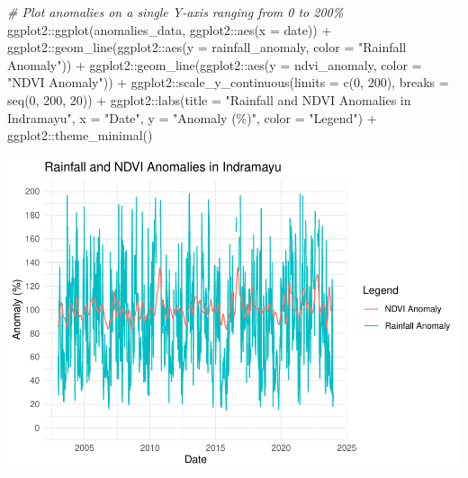 \documentclass[
]{article}
\newenvironment{Shaded}{}{}
\newcommand{\AttributeTok}[1]{\textcolor[rgb]{0.49,0.56,0.16}{#1}}
\newcommand{\CommentTok}[1]{\textcolor[rgb]{0.38,0.63,0.69}{\textit{#1}}}
\newcommand{\DecValTok}[1]{\textcolor[rgb]{0.25,0.63,0.44}{#1}}
\newcommand{\FunctionTok}[1]{\textcolor[rgb]{0.02,0.16,0.49}{#1}}
\newcommand{\NormalTok}[1]{#1}
\newcommand{\SpecialCharTok}[1]{\textcolor[rgb]{0.25,0.44,0.63}{#1}}
\newcommand{\StringTok}[1]{\textcolor[rgb]{0.25,0.44,0.63}{#1}}
\begin{document}
\begin{Shaded}
\begin{Highlighting}[]
\CommentTok{\# Plot anomalies on a single Y{-}axis ranging from 0 to 200\%}
\NormalTok{ggplot2}\SpecialCharTok{::}\FunctionTok{ggplot}\NormalTok{(anomalies\_data, ggplot2}\SpecialCharTok{::}\FunctionTok{aes}\NormalTok{(}\AttributeTok{x =}\NormalTok{ date)) }\SpecialCharTok{+}
\NormalTok{  ggplot2}\SpecialCharTok{::}\FunctionTok{geom\_line}\NormalTok{(ggplot2}\SpecialCharTok{::}\FunctionTok{aes}\NormalTok{(}\AttributeTok{y =}\NormalTok{ rainfall\_anomaly, }
                                  \AttributeTok{color =} \StringTok{"Rainfall Anomaly"}\NormalTok{)) }\SpecialCharTok{+}
\NormalTok{  ggplot2}\SpecialCharTok{::}\FunctionTok{geom\_line}\NormalTok{(ggplot2}\SpecialCharTok{::}\FunctionTok{aes}\NormalTok{(}\AttributeTok{y =}\NormalTok{ ndvi\_anomaly, }
                                  \AttributeTok{color =} \StringTok{"NDVI Anomaly"}\NormalTok{)) }\SpecialCharTok{+}
\NormalTok{  ggplot2}\SpecialCharTok{::}\FunctionTok{scale\_y\_continuous}\NormalTok{(}\AttributeTok{limits =} \FunctionTok{c}\NormalTok{(}\DecValTok{0}\NormalTok{, }\DecValTok{200}\NormalTok{), }
                              \AttributeTok{breaks =} \FunctionTok{seq}\NormalTok{(}\DecValTok{0}\NormalTok{, }\DecValTok{200}\NormalTok{, }\DecValTok{20}\NormalTok{)) }\SpecialCharTok{+}
\NormalTok{  ggplot2}\SpecialCharTok{::}\FunctionTok{labs}\NormalTok{(}\AttributeTok{title =} \StringTok{"Rainfall and NDVI Anomalies in Indramayu"}\NormalTok{,}
       \AttributeTok{x =} \StringTok{"Date"}\NormalTok{, }
       \AttributeTok{y =} \StringTok{"Anomaly (\%)"}\NormalTok{,}
       \AttributeTok{color =} \StringTok{"Legend"}\NormalTok{) }\SpecialCharTok{+}
\NormalTok{  ggplot2}\SpecialCharTok{::}\FunctionTok{theme\_minimal}\NormalTok{()}
\end{Highlighting}
\end{Shaded}

\begin{center}\includegraphics{BI_VegetationResponse_Project_HarvardX_Ph125_9x_files/figure-latex/eda_rain_ndvi_anom-1} \end{center}
\end{document}
